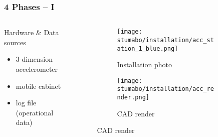 \begin{frame}
    \frametitle{4 Phases -- I}
    \vspace*{\fill}
    \begin{columns}[onlytextwidth, c]
        \begin{column}{.47\textwidth}
            \begin{exampleblock}{Hardware \& Data sources}
                \begin{itemize}
                    \item 3-dimension accelerometer
                    \item mobile cabinet
                    \item log file (operational data)
                \end{itemize}
            \end{exampleblock}
        \end{column}

        \begin{column}{.52\textwidth}
            \begin{figure}[ht]
                \begin{subfigure}{0.49\textwidth}
                    \centering
                    \texttt{[image: stumabo/installation/acc\_station\_1\_blue.png]}
                    \caption{Installation photo}
                \end{subfigure}
                \begin{subfigure}{0.49\textwidth}
                    \centering
                    \texttt{[image: stumabo/installation/acc\_render.png]}
                    \caption{CAD render}
                \end{subfigure}
            \end{figure}
        \end{column}
    \end{columns}
    \vspace*{\fill}
\end{frame}

